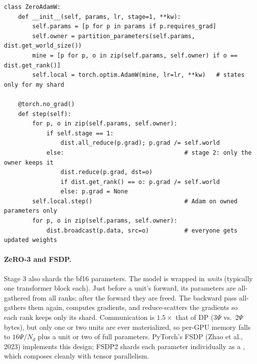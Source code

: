 \begin{lstlisting}[caption={ZeRO-1/2 with parameter-level ownership (\code{llmsys/dist/zero.py}, abridged).},label={lst:dist:zero}]
class ZeroAdamW:
    def __init__(self, params, lr, stage=1, **kw):
        self.params = [p for p in params if p.requires_grad]
        self.owner = partition_parameters(self.params, dist.get_world_size())
        mine = [p for p, o in zip(self.params, self.owner) if o == dist.get_rank()]
        self.local = torch.optim.AdamW(mine, lr=lr, **kw)   # states only for my shard

    @torch.no_grad()
    def step(self):
        for p, o in zip(self.params, self.owner):
            if self.stage == 1:
                dist.all_reduce(p.grad); p.grad /= self.world
            else:                                  # stage 2: only the owner keeps it
                dist.reduce(p.grad, dst=o)
                if dist.get_rank() == o: p.grad /= self.world
                else: p.grad = None
        self.local.step()                          # Adam on owned parameters only
        for p, o in zip(self.params, self.owner):
            dist.broadcast(p.data, src=o)          # everyone gets updated weights
\end{lstlisting}

\paragraph{ZeRO-3 and FSDP.} Stage 3 also shards the bf16 parameters. The model is wrapped in
\emph{units} (typically one transformer block each). Just before a unit's forward, its
parameters are all-gathered from all ranks; after the forward they are freed. The backward
pass all-gathers them again, computes gradients, and reduce-scatters the gradients so each
rank keeps only its shard. Communication is $1.5\times$ that of DP ($3\Psi$ vs.\ $2\Psi$
bytes), but only one or two units are ever materialized, so per-GPU memory falls to
$16\Psi/N_d$ plus a unit or two of full parameters. PyTorch's FSDP (Zhao et al., 2023)
implements this design; FSDP2 shards each parameter individually as a , which
composes cleanly with tensor parallelism.

